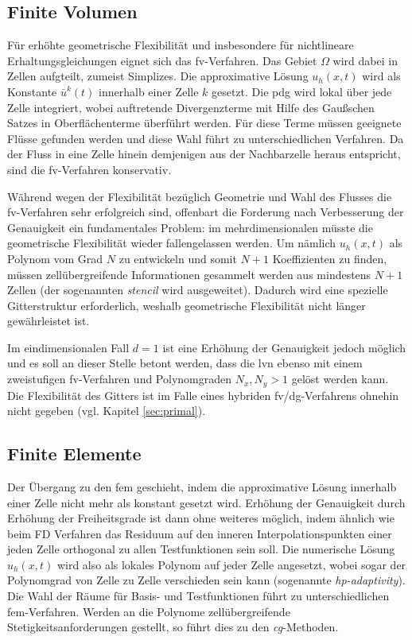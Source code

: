 \subsection{Finite Volumen}
Für erhöhte geometrische Flexibilität und insbesondere für nichtlineare Erhaltungsgleichungen eignet sich das \ac{fv}-Verfahren. Das Gebiet $\Omega$ wird dabei in Zellen aufgteilt, zumeist Simplizes. Die approximative Lösung $u_h(x,t)$ wird als Konstante $\bar{u}^k(t)$ innerhalb einer Zelle $k$ gesetzt. Die \ac{pdg} wird lokal über jede Zelle integriert, wobei auftretende Divergenzterme mit Hilfe des Gaußschen Satzes in Oberflächenterme überführt werden. Für diese Terme müssen geeignete Flüsse gefunden werden und diese Wahl führt zu unterschiedlichen Verfahren. Da der Fluss in eine Zelle hinein demjenigen aus der Nachbarzelle heraus entspricht, sind die \ac{fv}-Verfahren konservativ.

Während wegen der Flexibilität bezüglich Geometrie und Wahl des Flusses die \ac{fv}-Verfahren sehr erfolgreich sind, offenbart die Forderung nach Verbesserung der Genauigkeit ein fundamentales Problem: im mehrdimensionalen müsste die geometrische Flexibilität wieder fallengelassen werden. Um nämlich $u_h(x,t)$ als Polynom vom Grad $N$ zu entwickeln und somit ${N+1}$ Koeffizienten zu finden, müssen zellübergreifende Informationen gesammelt werden aus mindestens ${N+1}$ Zellen (der sogenannten \emph{stencil} wird ausgeweitet). Dadurch wird eine spezielle Gitterstruktur erforderlich, weshalb geometrische Flexibilität nicht länger gewährleistet ist.

Im eindimensionalen Fall $d=1$ ist eine Erhöhung der Genauigkeit jedoch möglich und es soll an dieser Stelle betont werden, dass die \ac{lvn} ebenso mit einem zweistufigen \ac{fv}-Verfahren und Polynomgraden ${N_x,N_y > 1}$ gelöst werden kann. Die Flexibilität des Gitters ist im Falle eines hybriden \ac{fv}/\ac{dg}-Verfahrens ohnehin nicht gegeben (vgl. Kapitel \ref{sec:primal}).

\subsection{Finite Elemente}
Der Übergang zu den \ac{fem} geschieht, indem die approximative Lösung innerhalb einer Zelle nicht mehr als konstant gesetzt wird. Erhöhung der Genauigkeit durch Erhöhung der Freiheitsgrade ist dann ohne weiteres möglich, indem ähnlich wie beim FD Verfahren das Residuum auf den inneren Interpolationspunkten einer jeden Zelle orthogonal zu allen Testfunktionen sein soll. Die numerische Lösung $u_h(x,t)$ wird also als lokales Polynom auf jeder Zelle angesetzt, wobei sogar der Polynomgrad von Zelle zu Zelle verschieden sein kann (sogenannte \emph{hp-adaptivity}). Die Wahl der Räume für Basis- und Testfunktionen führt zu unterschiedlichen \ac{fem}-Verfahren. Werden an die Polynome zellübergreifende Stetigkeitsanforderungen gestellt, so führt dies zu den \emph{\ac{cg}}-Methoden.

